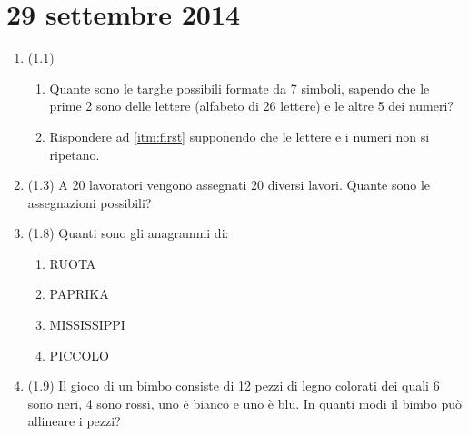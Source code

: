 \section{29 settembre 2014}

\begin{enumerate}
\item (1.1)
\begin{enumerate}
\item \label{itm:first}Quante sono le targhe possibili formate da 7 simboli, sapendo che le prime 2 sono delle lettere (alfabeto di 26 lettere) e le altre 5 dei numeri?
\item Rispondere ad \ref{itm:first} supponendo che le lettere e i numeri non si ripetano.
\end{enumerate}
\item (1.3) A 20 lavoratori vengono assegnati 20 diversi lavori. Quante sono le assegnazioni possibili?
\item (1.8) Quanti sono gli anagrammi di:
\begin{enumerate}
\item RUOTA
\item PAPRIKA
\item MISSISSIPPI
\item PICCOLO
\end{enumerate}
\item (1.9) Il gioco di un bimbo consiste di 12 pezzi di legno colorati dei quali 6 sono neri, 4 sono rossi, uno \`e bianco e uno \`e blu. In quanti modi il bimbo pu\`o allineare i pezzi?
\end{enumerate}